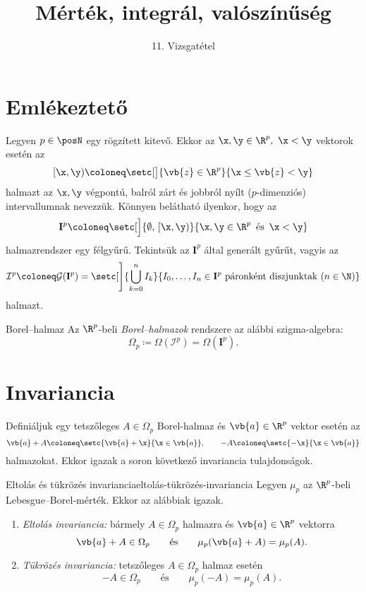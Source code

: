 \documentclass[
]{elteikthesis}[2024/04/26]
\title{Mérték, integrál, valószínűség} %
\subtitle{11. Vizsgatétel}
\begin{document}
	
	
	\section{Emlékeztető}
	
	Legyen \( p \in \posN \) egy rögzített kitevő. 
	Ekkor az \( \x, \y \in \R^p, \ \x < \y \) vektorok esetén az
	\[
		[\x, \y) \coloneq 
		\setc[\big]{ \vb{z} \in \R^p }{ \x \leq \vb{z} < \y }
	\]
	halmazt az \( \x, \y \) végpontú, balról zárt és jobbról nyílt (\( p \)-dimenziós) intervallumnak nevezzük. Könnyen belátható ilyenkor, hogy az
	\[
		\mathbf{I}^p \coloneq 
		\setc[\Big]{ \emptyset,\, [\x, \y) }{ \x, \y \in \R^p \,\text{ és }\, \x < \y }
	\]
	halmazrendszer egy félgyűrű. Tekintsük az \( \mathbf{I}^p \) által generált gyűrűt, vagyis az
	\[
		\mathcal{I}^p \coloneq 
		\mathcal{G}( \mathbf{I}^p ) =
		\setc[\Bigg]{ \bigcup_{k=0}^n I_k }
		{ I_0, \dots, I_n \in \mathbf{I}^p \text{ páronként diszjunktak } (n \in \N) }
	\]
	halmazt.
	
	\begin{definition}{Borel--halmaz}{}
		Az \( \R^p \)-beli \emph{Borel--halmazok} rendszere az alábbi szigma-algebra:
		\[
		\Omega_p \coloneq \Omega( \mathcal{I}^p ) = \Omega( \mathbf{I}^p ).
		\]
	\end{definition}
	
	\section{Invariancia}
	
	Definiáljuk egy tetszőleges \( A \in \Omega_p \) Borel-halmaz és \( \vb{a} \in \R^p \) vektor esetén az
	\[
		\vb{a} + A  \coloneq \setc{ \vb{a} + \x }{ \x \in \vb{a} }, \qquad
		-A \coloneq \setc{ -\x }{ \x \in \vb{a} }
	\]
	halmazokat. Ekkor igazak a soron következő invariancia tulajdonságok.
	
	\begin{statement}{Eltolás és tükrözés invariancia}{eltolás-tükrözés-invariancia}
		Legyen \( \mu_p \) az \( \R^p \)-beli Lebesgue--Borel-mérték.
		Ekkor az alábbiak igazak.
		\begin{enumerate}[label=\alph*)]
			\item
			\emph{Eltolás invariancia:} 
			bármely \( A \in \Omega_p \) halmazra és \( \vb{a} \in \R^p \) vektorra
			\[
				\vb{a} + A \in \Omega_p
				\qquad \text{és} \qquad
				\mu_p( \vb{a} + A ) = \mu_p(A).
			\]
			
			\item
			\emph{Tükrözés invariancia:} 
			tetszőleges \( A \in \Omega_p \) halmaz esetén
			\[
				-A \in \Omega_p
				\qquad \text{és} \qquad
				\mu_p( -A ) = \mu_p(A).
			\]
		\end{enumerate}
	\end{statement}
	
\end{document}
